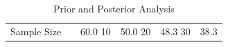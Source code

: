 \begin{table}
\caption{Prior and Posterior Analysis}
\label{tab:percent_helped}
\begin{tabular}{rll}
\toprule
Sample Size & %
 & 60.0%
10 & 50.0%
20 & 48.3%
30 & 38.3%
\bottomrule
\end{tabular}
\end{table}
